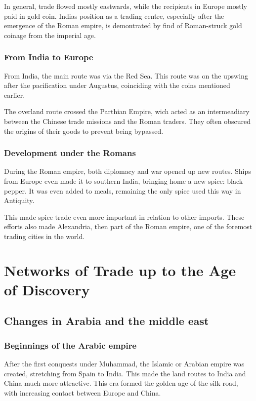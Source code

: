 \documentclass[11pt, a4paper, headings=standardclasses]{scrartcl}
\begin{document}
In general, trade flowed mostly eastwards, while the recipients in Europe mostly paid in gold coin. Indias position as a trading centre, especially after the emergence of the Roman empire, is demontrated by find of Roman-struck gold coinage from the imperial age.\autocite[100]{curtin_1984}

\subsubsection{From India to Europe}

From India, the main route was via the Red Sea. This route was on the upswing after the pacification under Augustus, coinciding with the coins mentioned earlier.\autocite[Chapter 7]{Rome}

The overland route crossed the Parthian Empire, wich acted as an intermeadiary between the Chinese trade missions and the Roman traders. They often obscured the origins of their goods to prevent being bypassed.\autocite{SilkRome}

\subsubsection{Development under the Romans}

During the Roman empire, both diplomacy and war opened up new routes. Ships from Europe even made it to southern India, bringing home a new spice: black pepper. It was even added to meals, remaining the only spice used this way in Antiquity.\autocite{RIS}

This made spice trade even more important in relation to other imports.\autocite{SilkRome, Rome} These efforts also made Alexandria, then part of the Roman empire, one of the foremost trading cities in the world.\autocite{SpiceTrade}
\section{Networks of Trade up to the Age of Discovery}

\subsection{Changes in Arabia and the middle east}

\subsubsection{Beginnings of the Arabic empire}
After the first conquests under Muhammad, the Islamic or Arabian empire was created, stretching from Spain to India\autocite[Section \textit{Achievements}]{Umayyad}. This made the land routes to India and China much more attractive. This era formed the golden age of the silk road, with increasing contact between Europe and China.
\end{document}
